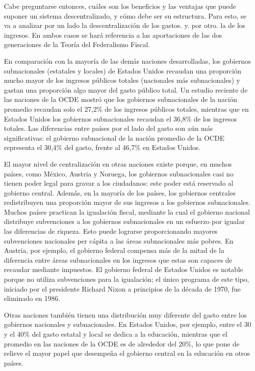 \documentclass[10pt,a4paper]{article}
\begin{document}
Cabe preguntarse entonces, cuáles son los beneficios y las ventajas que puede suponer un sistema descentralizado, y cómo debe ser su estructura. Para esto, se va a analizar por un lado la descentralización de los gastos. y. por otro. la de los ingresos. En ambos casos se hará referencia a las aportaciones de las dos generaciones de la Teoría del Federalismo Fiscal.

En comparación con la mayoría de las demás naciones desarrolladas, los gobiernos subnacionales (estatales y locales) de Estados Unidos recaudan una proporción mucho mayor de los ingresos públicos totales (nacionales más subnacionales) y gastan una proporción algo mayor del gasto público total. Un estudio reciente de las naciones de la OCDE mostró que los gobiernos subnacionales de la nación promedio recaudan solo el 27,2\% de los ingresos públicos totales, mientras que en Estados Unidos los gobiernos subnacionales recaudan el 36,8\% de los ingresos totales. Las diferencias entre países por el lado del gasto son aún más significativas: el gobierno subnacional de la nación promedio de la OCDE representa el 30,4\% del gasto, frente al 46,7\% en Estados Unidos.

El mayor nivel de centralización en otras naciones existe porque, en muchos países, como México, Austria y Noruega, los gobiernos subnacionales casi no tienen poder legal para gravar a los ciudadanos: este poder está reservado al gobierno central. Además, en la mayoría de los países, los gobiernos centrales redistribuyen una proporción mayor de sus ingresos a los gobiernos subnacionales. Muchos países practican la igualación fiscal, mediante la cual el gobierno nacional distribuye subvenciones a los gobiernos subnacionales en un esfuerzo por igualar las diferencias de riqueza. Esto puede lograrse proporcionando mayores subvenciones nacionales per cápita a las áreas subnacionales más pobres. En Austria, por ejemplo, el gobierno federal compensa más de la mitad de la diferencia entre áreas subnacionales en los ingresos que estas son capaces de recaudar mediante impuestos. El gobierno federal de Estados Unidos es notable porque no utiliza subvenciones para la igualación; el único programa de este tipo, iniciado por el presidente Richard Nixon a principios de la década de 1970, fue eliminado en 1986.

Otras naciones también tienen una distribución muy diferente del gasto entre los gobiernos nacionales y subnacionales. En Estados Unidos, por ejemplo, entre el 30 y el 40\% del gasto estatal y local se dedica a la educación, mientras que el promedio en las naciones de la OCDE es de alrededor del 20\%, lo que pone de relieve el mayor papel que desempeña el gobierno central en la educación en otros países.
\end{document}
